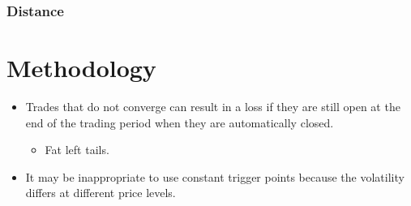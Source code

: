 \documentclass[pdf,9pt,xcolor=dvipsnames,hide notes]{beamer}
\begin{document}
\begin{frame}[label=frame2d]
	\frametitle{Distance}
		\section{Methodology}
		

\begin{itemize}
	\justifying
	
	
	\vspace{0.3cm}
	
	\item Trades that do not converge can result in a loss if they are still open at the end of the trading period when they are automatically closed. 
	
	\pause
	
	\begin{itemize}
		\item Fat left tails.
	\end{itemize}
	
	\vspace{0.3cm}
	
	\pause
	\item It may be inappropriate to use constant trigger points because the volatility differs at different price levels.
	
\end{itemize}


\end{frame}
\end{document}
